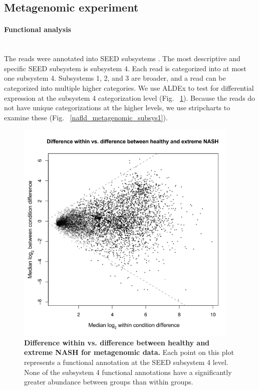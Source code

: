 \FloatBarrier

\subsection{Metagenomic experiment}

\paragraph{Functional analysis}\mbox{}\\
The reads were annotated into SEED subsystems \cite{overbeek2005subsystems}. The most descriptive and specific SEED subsystem is subsystem 4. Each read is categorized into at most one subsystem 4. Subsystems 1, 2, and 3 are broader, and a read can be categorized into multiple higher categories. We use ALDEx to test for differential expression at the subsystem 4 categorization level (Fig. ~\ref{nafld_metagenomic_aldex}). Because the reads do not have unique categorizations at the higher levels, we use stripcharts to examine these (Fig. ~\ref{nafld_metagenomic_subsys1}).

\begin{figure}[h]
\begin{center}
\includegraphics[width=0.95\textwidth]{metagenomic_aldex.png}
\caption[Difference within vs. difference between healthy and extreme NASH for metagenomic data.]{\textbf{Difference within vs. difference between healthy and extreme NASH for metagenomic data.} Each point on this plot represents a functional annotation at the SEED subsystem 4 level. None of the subsystem 4 functional annotations have a significantly greater abundance between groups than within groups.}
\label{nafld_metagenomic_aldex}
\end{center}
\end{figure}

